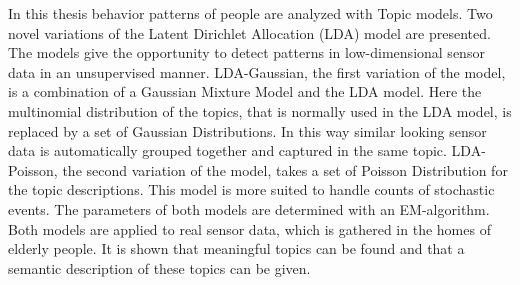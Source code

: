 In this thesis behavior patterns of people are analyzed with Topic models. Two novel variations of the Latent Dirichlet Allocation (LDA) model are presented. The models give the opportunity to detect patterns in low-dimensional sensor data in an unsupervised manner. LDA-Gaussian, the first variation of the model, is a combination of a Gaussian Mixture Model and the LDA model. Here the multinomial distribution of the topics, that is normally used in the LDA model, is replaced by a set of Gaussian Distributions. In this way similar looking sensor data is automatically grouped together and captured in the same topic.
LDA-Poisson, the second variation of the model, takes a set of Poisson Distribution for the topic descriptions. This model is more suited to handle counts of stochastic events. The parameters of both models are determined with an EM-algorithm.
Both models are applied to real sensor data, which is gathered in the homes of elderly people. It is shown that meaningful topics can be found and that a semantic description of these topics can be given.